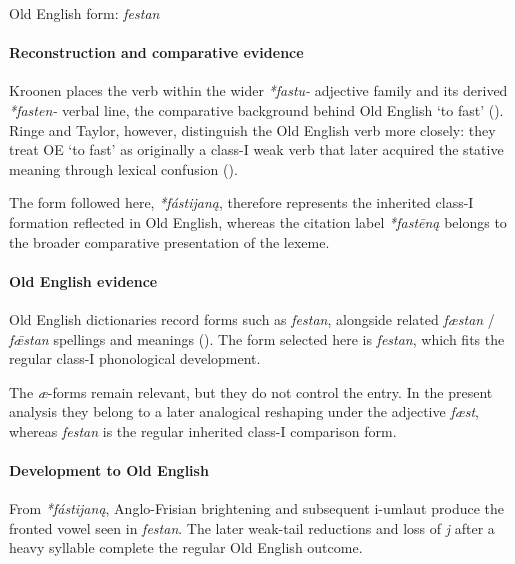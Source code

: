 \documentclass[
  british,
  a4paper,
]{article}
\begin{document}
Old English form: \emph{festan}

\paragraph{Reconstruction and comparative
evidence}\label{reconstruction-and-comparative-evidence-9}

Kroonen places the verb within the wider \emph{*fastu-} adjective family
and its derived \emph{*fasten-} verbal line, the comparative background
behind Old English `to fast' (). Ringe and Taylor, however, distinguish the Old English verb more
closely: they treat OE `to fast' as originally a class-I weak verb that
later acquired the stative meaning through lexical confusion
().

The form followed here, \emph{*fástijaną}, therefore represents the
inherited class-I formation reflected in Old English, whereas the
citation label \emph{*fastēną} belongs to the broader comparative
presentation of the lexeme.

\paragraph{Old English evidence}\label{old-english-evidence-9}

Old English dictionaries record forms such as \emph{festan}, alongside
related \emph{fæstan} / \emph{fǣstan} spellings and meanings
(). The
form selected here is \emph{festan}, which fits the regular class-I
phonological development.

The \emph{æ}-forms remain relevant, but they do not control the entry.
In the present analysis they belong to a later analogical reshaping
under the adjective \emph{fæst}, whereas \emph{festan} is the regular
inherited class-I comparison form.

\paragraph{Development to Old
English}\label{development-to-old-english-9}

From \emph{*fástijaną}, Anglo-Frisian brightening and subsequent
i-umlaut produce the fronted vowel seen in \emph{festan}. The later
weak-tail reductions and loss of \emph{j} after a heavy syllable
complete the regular Old English outcome.
\end{document}
